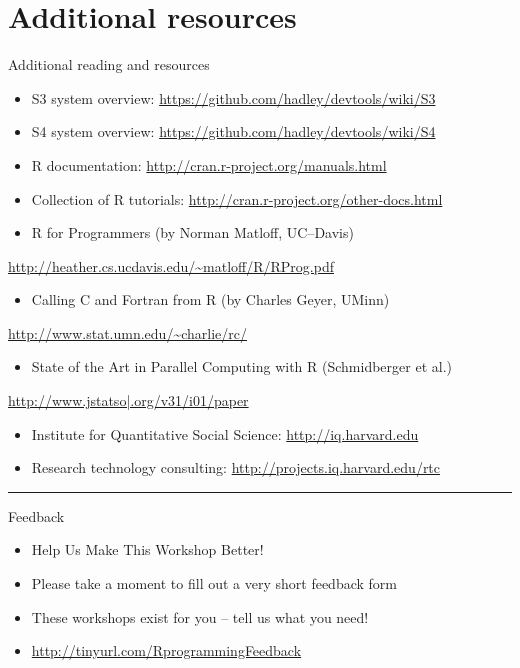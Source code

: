 \documentclass[table,smaller]{beamer}
\begin{document}
\section{Additional resources}
\label{sec-9}

\begin{frame}[label=sec-9-1]{Additional reading and resources}
\begin{itemize}
\item S3 system overview: \url{https://github.com/hadley/devtools/wiki/S3}
\item S4 system overview: \url{https://github.com/hadley/devtools/wiki/S4}
\item R documentation: \url{http://cran.r-project.org/manuals.html}
\item Collection of R tutorials: \url{http://cran.r-project.org/other-docs.html}

\item R for Programmers (by Norman Matloff, UC--Davis)
\end{itemize}
\url{http://heather.cs.ucdavis.edu/~matloff/R/RProg.pdf}
\begin{itemize}
\item Calling C and Fortran from R (by Charles Geyer, UMinn)
\end{itemize}
\url{http://www.stat.umn.edu/~charlie/rc/}
\begin{itemize}
\item State of the Art in Parallel Computing with R (Schmidberger et al.)
\end{itemize}
\url{http://www.jstatso|.org/v31/i01/paper}

\begin{itemize}
\item Institute for Quantitative Social Science: \url{http://iq.harvard.edu}
\item Research technology consulting: \url{http://projects.iq.harvard.edu/rtc}
\end{itemize}

\rule{\linewidth}{0.5pt}
\end{frame}
\begin{frame}[label=sec-9-2]{Feedback}
\begin{itemize}
\item Help Us Make This Workshop Better!
\item Please take a moment to fill out a very short feedback form
\item These workshops exist for you -- tell us what you need!
\item \url{http://tinyurl.com/RprogrammingFeedback}
\end{itemize}
\end{frame}
\end{document}
